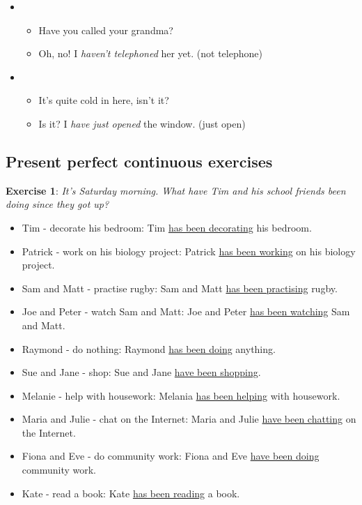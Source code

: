 \begin{itemize}
\item
\begin{itemize}
\item Have you called your grandma?
\item Oh, no! I \textit{haven't telephoned} her yet. (not telephone)
\end{itemize}

\item
\begin{itemize}
\item It's quite cold in here, isn't it?
\item Is it? I \textit{have just opened} the window. (just open)
\end{itemize}

\end{itemize}

\subsection{Present perfect continuous exercises}

\textbf{Exercise 1}: \textit{It's Saturday morning. What have Tim and his school friends been doing since they got up?}

\begin{itemize}

\item Tim - decorate his bedroom: Tim \underline{has been decorating} his bedroom.
\item Patrick - work on his biology project: Patrick \underline{has been working} on his biology project.\item Sam and Matt - practise rugby: Sam and Matt \underline{has been practising} rugby.
\item Joe and Peter - watch Sam and Matt: Joe and Peter \underline{has been watching} Sam and Matt.
\item Raymond - do nothing: Raymond \underline{has been doing} anything.
\item Sue and Jane - shop: Sue and Jane \underline{have been shopping}.
\item Melanie - help with housework: Melania \underline{has been helping} with housework.
\item Maria and Julie - chat on the Internet: Maria and Julie \underline{have been chatting} on the Internet.
\item Fiona and Eve - do community work: Fiona and Eve \underline{have been doing} community work.
\item Kate - read a book: Kate \underline{has been reading} a book.
\end{itemize}

